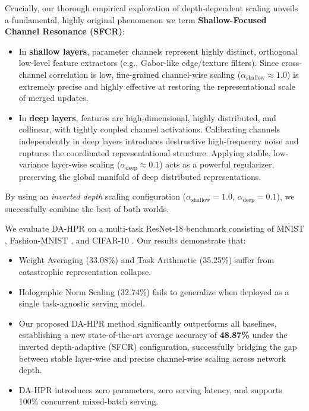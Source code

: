 \documentclass{article}
\theoremstyle{plain}
\theoremstyle{definition}
\theoremstyle{remark}
\begin{document}
Crucially, our thorough empirical exploration of depth-dependent scaling unveils a fundamental, highly original phenomenon we term \textbf{Shallow-Focused Channel Resonance (SFCR)}:
\begin{itemize}
    \item In \textbf{shallow layers}, parameter channels represent highly distinct, orthogonal low-level feature extractors (e.g., Gabor-like edge/texture filters). Since cross-channel correlation is low, fine-grained channel-wise scaling ($\alpha_{\text{shallow}} \approx 1.0$) is extremely precise and highly effective at restoring the representational scale of merged updates.
    \item In \textbf{deep layers}, features are high-dimensional, highly distributed, and collinear, with tightly coupled channel activations. Calibrating channels independently in deep layers introduces destructive high-frequency noise and ruptures the coordinated representational structure. Applying stable, low-variance layer-wise scaling ($\alpha_{\text{deep}} \approx 0.1$) acts as a powerful regularizer, preserving the global manifold of deep distributed representations.
\end{itemize}
By using an \emph{inverted depth} scaling configuration ($\alpha_{\text{shallow}} = 1.0$, $\alpha_{\text{deep}} = 0.1$), we successfully combine the best of both worlds.

We evaluate DA-HPR on a multi-task ResNet-18 benchmark consisting of MNIST \cite{lecun1998gradient}, Fashion-MNIST \cite{xiao2017fashion}, and CIFAR-10 \cite{krizhevsky2009learning}.
Our results demonstrate that:
\begin{itemize}
    \item Weight Averaging (33.08\%) and Task Arithmetic (35.25\%) suffer from catastrophic representation collapse.
    \item Holographic Norm Scaling (32.74\%) fails to generalize when deployed as a single task-agnostic serving model.
    \item Our proposed DA-HPR method significantly outperforms all baselines, establishing a new state-of-the-art average accuracy of \textbf{48.87\%} under the inverted depth-adaptive (SFCR) configuration, successfully bridging the gap between stable layer-wise and precise channel-wise scaling across network depth.
    \item DA-HPR introduces zero parameters, zero serving latency, and supports 100\% concurrent mixed-batch serving.
\end{itemize}
\end{document}
